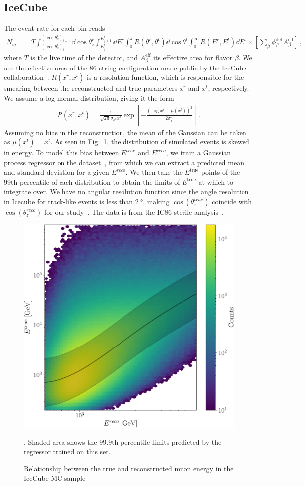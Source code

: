 \documentclass[draft=True]{revtex4-2}
\newcommand{\zreco}{\ensuremath{\cos{(\theta_z^{reco})}}}
\newcommand{\ztrue}{\ensuremath{\cos{(\theta_z^{true})}}}
\begin{document}
\subsection{IceCube}\label{ch:ICmethod}
The event rate for each bin reads
\begin{align}\label{eq:ICevents}
    N_{ij} &= T \int_{(\cos{\theta_z^r})_i}^{(\cos{\theta_z^r})_{i+1}} \dd \cos{\theta^r_z} \int_{E^r_{j}}^{E^r_{j+1}} \dd E^r \int_0^\pi R(\theta^r,\theta^t) \dd \cos{\theta^t} \int_0^\infty R(E^r,E^t) \dd E^t
    \times \left[ \sum_\beta \phi_\beta^\text{det}  A^\text{eff}_\beta\right]\,,
\end{align}
where $T$ is the live time of the detector, and $A^\text{eff}_\beta$ its effective area for flavor $\beta$. We use the effective area of the 86 string configuration made public by the IceCube collaboration~\cite{ICaeff}. $R(x^r,x^t)$ is a resolution function, 
which is responsible for the smearing between the reconstructed and true parameters $x^r$ and $x^t$, respectively. We assume a log-normal distribution, giving it the form 
\begin{align}
    R(x^r, x^t) = \frac{1}{\sqrt{2\pi} \sigma_{x^r}x^r} \exp\left[-\frac{(\log x^r-\mu(x^t))^2}{2\sigma_{x^r}^2}\right]\,.
\end{align}
Assuming no bias in the reconstruction, the mean of the Gaussian can be taken as $\mu(x^t) = x^t$. As seen in Fig.~\ref{fig:IC_MC_counts}, the distribution of 
simulated events is skewed in energy. To model this bias between $E^{true}$ and $E^{reco}$, we train a Gaussian process regressor on the dataset~\cite{IC2016}, from which
we can extract a predicted mean and standard deviation for a given $E^{reco}$. We then take the $E^\text{true}$ points of the 99th percentile of each distribution to obtain
the limits of $E^\text{true}$ at which to integrate over. We have no angular resolution function since the angle resolution in Icecube for track-like events is less than $\SI{2}{\degree}$, making $\ztrue$ coincide with $\zreco$ for our study~\cite{IC2020}. 
The data is from the IC86 sterile analysis~\cite{IC2020}.
\begin{figure}[!tb]
    \begin{center}
       \includegraphics[width=0.4\linewidth]{figures/IC_MC_gpr.pdf}
    \end{center}
    \caption{Relationship between the true and reconstructed muon energy in the IceCube MC sample~\cite{IC2016}}\label{fig:IC_MC_counts}. Shaded area shows the $99.9$th percentile limits predicted by the regressor trained on this set.
 \end{figure}
\end{document}
